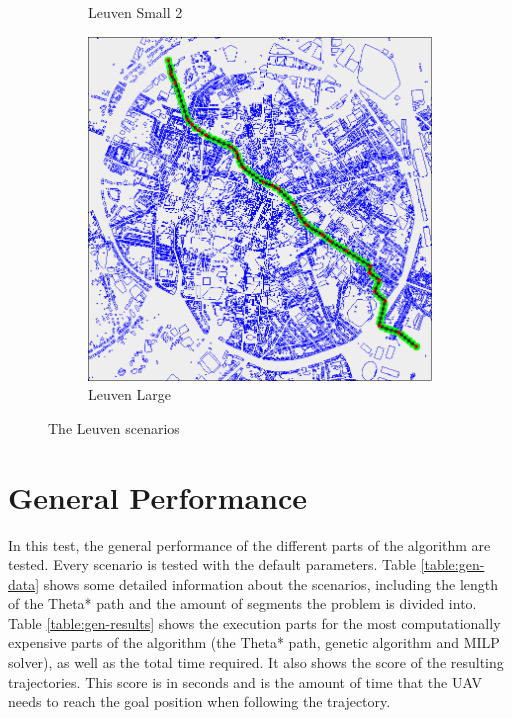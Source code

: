 \begin{figure}
\begin{subfigure}[t]{0.46\textwidth}
        		\caption{Leuven Small 2}
        		\label{fig:leuven-small-2}
	\end{subfigure}	
	\par
	\begin{subfigure}[t]{0.8\textwidth}
        		\includegraphics[width=\textwidth]{img/leuven-large}
        		\caption{Leuven Large}
        		\label{fig:leuven-large}
	\end{subfigure}
        
    \caption{The Leuven scenarios}\label{fig:leuven-scens}
\end{figure}
\clearpage
\section{General Performance}
In this test, the general performance of the different parts of the algorithm are tested. Every scenario is tested with the default parameters. Table \ref{table:gen-data} shows some detailed information about the scenarios, including the length of the Theta* path and the amount of segments the problem is divided into. Table \ref{table:gen-results} shows the execution parts for the most computationally expensive parts of the algorithm (the Theta* path, genetic algorithm and MILP solver), as well as the total time required. It also shows the score of the resulting trajectories. This score is in seconds and is the amount of time that the UAV needs to reach the goal position when following the trajectory. 

